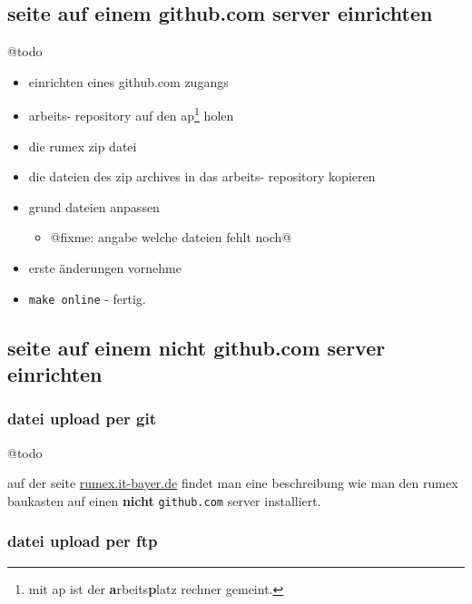 \subsection{seite auf einem github.com server
einrichten}\label{seite-auf-einem-github.com-server-einrichten}

@todo

\begin{itemize}
\itemsep1pt\parskip0pt
\item
  einrichten eines github.com zugangs
\item
  arbeits- repository auf den ap\footnote{mit ap ist der
    \textbf{a}rbeits\textbf{p}latz rechner gemeint.} holen
\item
  die rumex zip datei
\item
  die dateien des zip archives in das arbeits- repository kopieren
\item
  grund dateien anpassen

  \begin{itemize}
  \itemsep1pt\parskip0pt
  \item
    @fixme: angabe welche dateien fehlt noch@
  \end{itemize}
\item
  erste änderungen vornehme
\item
  \texttt{make online} - fertig.
\end{itemize}

\subsection{seite auf einem nicht github.com server
einrichten}\label{seite-auf-einem-nicht-github.com-server-einrichten}

\subsubsection{datei upload per git}\label{datei-upload-per-git}

@todo

auf der seite \href{http://rumex.it-bayer.de}{rumex.it-bayer.de} findet
man eine beschreibung wie man den rumex baukasten auf einen
\textbf{nicht} \texttt{github.com} server installiert.

\subsubsection{datei upload per ftp}\label{datei-upload-per-ftp}

